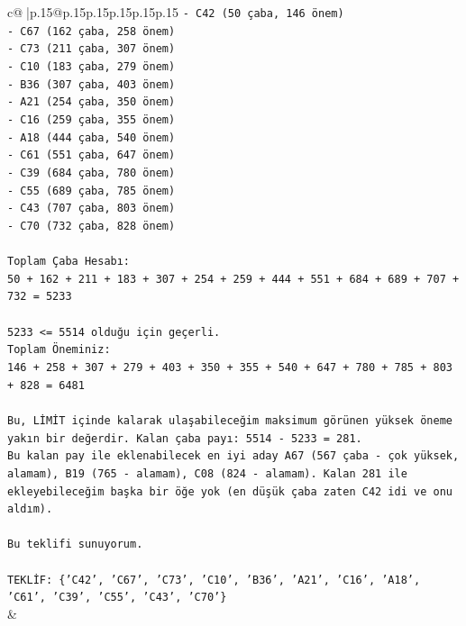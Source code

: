 \documentclass{article}
\begin{document}
{\begin{supertabular}{c@{$\;$}|p{.15\linewidth}@{}p{.15\linewidth}p{.15\linewidth}p{.15\linewidth}p{.15\linewidth}p{.15\linewidth}}
{{{\texttt{{-} C42 (50 çaba, 146 önem)} \\
\texttt{{-} C67 (162 çaba, 258 önem)} \\
\texttt{{-} C73 (211 çaba, 307 önem)} \\
\texttt{{-} C10 (183 çaba, 279 önem)} \\
\texttt{{-} B36 (307 çaba, 403 önem)} \\
\texttt{{-} A21 (254 çaba, 350 önem)} \\
\texttt{{-} C16 (259 çaba, 355 önem)} \\
\texttt{{-} A18 (444 çaba, 540 önem)} \\
\texttt{{-} C61 (551 çaba, 647 önem)} \\
\texttt{{-} C39 (684 çaba, 780 önem)} \\
\texttt{{-} C55 (689 çaba, 785 önem)} \\
\texttt{{-} C43 (707 çaba, 803 önem)} \\
\texttt{{-} C70 (732 çaba, 828 önem)} \\
\\ 
\texttt{Toplam Çaba Hesabı:} \\
\texttt{50 + 162 + 211 + 183 + 307 + 254 + 259 + 444 + 551 + 684 + 689 + 707 + 732 = 5233} \\
\\ 
\texttt{5233 <= 5514 olduğu için geçerli.} \\
\texttt{Toplam Öneminiz:} \\
\texttt{146 + 258 + 307 + 279 + 403 + 350 + 355 + 540 + 647 + 780 + 785 + 803 + 828 = 6481} \\
\\ 
\texttt{Bu, LİMİT içinde kalarak ulaşabileceğim maksimum görünen yüksek öneme yakın bir değerdir. Kalan çaba payı: 5514 {-} 5233 = 281.} \\
\texttt{Bu kalan pay ile eklenabilecek en iyi aday A67 (567 çaba {-} çok yüksek, alamam), B19 (765 {-} alamam), C08 (824 {-} alamam). Kalan 281 ile ekleyebileceğim başka bir öğe yok (en düşük çaba zaten C42 idi ve onu aldım).} \\
\\ 
\texttt{Bu teklifi sunuyorum.} \\
\\ 
\texttt{TEKLİF: \{'C42', 'C67', 'C73', 'C10', 'B36', 'A21', 'C16', 'A18', 'C61', 'C39', 'C55', 'C43', 'C70'\}} \\
            }
        }
    }
    & \\ \\


\end{supertabular}}
\end{document}
